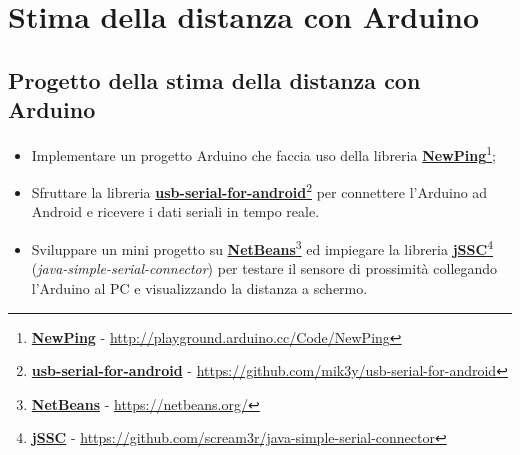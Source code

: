 \chapter{Stima della distanza con Arduino}
\section{Progetto della stima della distanza con Arduino}



\begin{itemize}
	 \item Implementare un progetto Arduino che faccia uso della libreria \href{http://playground.arduino.cc/Code/NewPing}{\textbf{NewPing}}\footnote{\href{http://playground.arduino.cc/Code/NewPing}{\textbf{NewPing}} - \url{http://playground.arduino.cc/Code/NewPing}};
	 
	 \item Sfruttare la libreria \href{https://github.com/mik3y/usb-serial-for-android}{\textbf{usb-serial-for-android}}\footnote{\href{https://github.com/mik3y/usb-serial-for-android}{\textbf{usb-serial-for-android}} - \url{https://github.com/mik3y/usb-serial-for-android}} per connettere l'Arduino ad Android e ricevere i dati seriali in tempo reale.
	 
	 \item Sviluppare un mini progetto su \href{https://netbeans.org/}{\textbf{NetBeans}}\footnote{\href{https://netbeans.org/}{\textbf{NetBeans}} - \url{https://netbeans.org/}} ed impiegare la libreria \href{https://github.com/scream3r/java-simple-serial-connector}{\textbf{jSSC}}\footnote{\href{https://github.com/scream3r/java-simple-serial-connector}{\textbf{jSSC}} - \url{https://github.com/scream3r/java-simple-serial-connector}} (\textit{java-simple-serial-connector}) per testare il sensore di prossimità collegando l'Arduino al PC e visualizzando la distanza a schermo.
\end{itemize}

